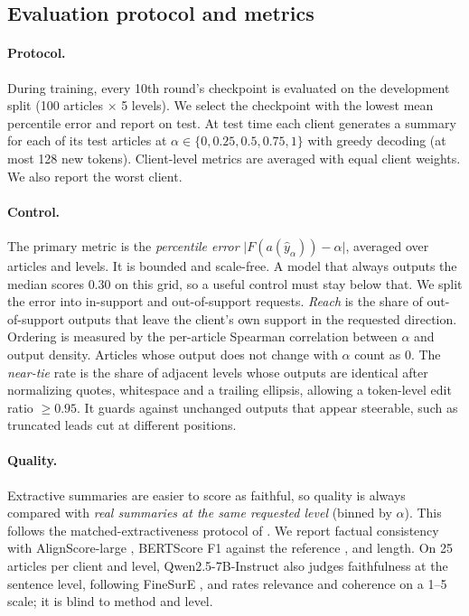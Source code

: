 \documentclass[11pt]{article}
\begin{document}
\subsection{Evaluation protocol and metrics}
\label{sec:setup-eval}

\paragraph{Protocol.}
During training, every 10th round's checkpoint is evaluated on the development split (100 articles $\times$ 5 levels).
We select the checkpoint with the lowest mean percentile error and report on test.
At test time each client generates a summary for each of its test articles at $\alpha\in\{0, 0.25, 0.5, 0.75, 1\}$ with greedy decoding (at most 128 new tokens).
Client-level metrics are averaged with equal client weights.
We also report the worst client.

\paragraph{Control.}
The primary metric is the \emph{percentile error} $\lvert F(a(\hat y_\alpha))-\alpha\rvert$, averaged over articles and levels.
It is bounded and scale-free.
A model that always outputs the median scores $0.30$ on this grid, so a useful control must stay below that.
We split the error into in-support and out-of-support requests.
\emph{Reach} is the share of out-of-support outputs that leave the client's own support in the requested direction.
Ordering is measured by the per-article Spearman correlation between $\alpha$ and output density.
Articles whose output does not change with $\alpha$ count as 0.
The \emph{near-tie} rate is the share of adjacent levels whose outputs are identical after normalizing quotes, whitespace and a trailing ellipsis, allowing a token-level edit ratio $\geq 0.95$.
It guards against unchanged outputs that appear steerable, such as truncated leads cut at different positions.

\paragraph{Quality.}
Extractive summaries are easier to score as faithful, so quality is always compared with \emph{real summaries at the same requested level} (binned by $\alpha$).
This follows the matched-extractiveness protocol of \citet{ladhak-etal-2022-faithful}.
We report factual consistency with AlignScore-large \citep{zha-etal-2023-alignscore}, BERTScore F1 against the reference \citep{zhang-etal-2020-bertscore}, and length.
On 25 articles per client and level, Qwen2.5-7B-Instruct also judges faithfulness at the sentence level, following FineSurE \citep{song-etal-2024-finesure}, and rates relevance and coherence on a 1--5 scale; it is blind to method and level.
\end{document}
